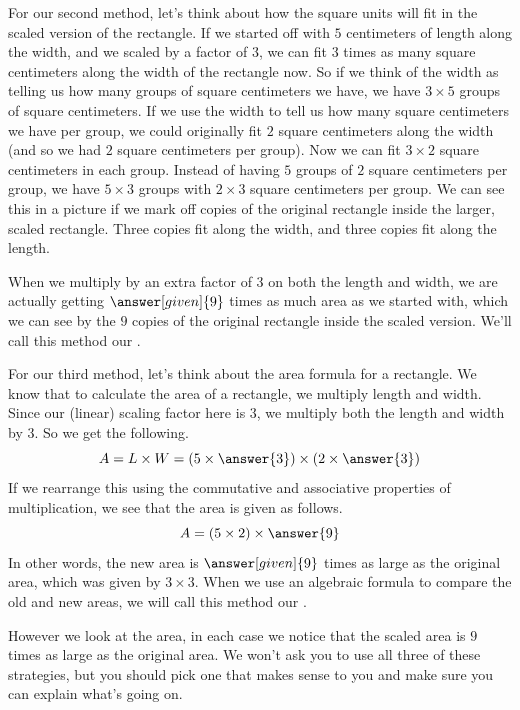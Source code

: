 \documentclass{ximera}
\begin{document}
\begin{explanation}
For our second method, let's think about how the square units will fit in the scaled version of the rectangle. If we started off with $5$ centimeters of length along the width, and we scaled by a factor of $3$, we can fit $3$ times as many square centimeters along the width of the rectangle now. So if we think of the width as telling us how many groups of square centimeters we have, we have $3 \times 5$ groups of square centimeters. If we use the width to tell us how many square centimeters we have per group, we could originally fit $2$ square centimeters along the width (and so we had $2$ square centimeters per group). Now we can fit $3 \times 2$ square centimeters in each group. Instead of having $5$ groups of $2$ square centimeters per group, we have $5 \times 3$ groups with $2 \times 3$ square centimeters per group. We can see this in a picture if we mark off copies of the original rectangle inside the larger, scaled rectangle. Three copies fit along the width, and three copies fit along the length.
\begin{image}
\end{image}
When we multiply by an extra factor of $3$ on both the length and width, we are actually getting $\answer[given]{9}$ times as much area as we started with, which we can see by the $9$ copies of the original rectangle inside the scaled version. We'll call this method our .

For our third method, let's think about the area formula for a rectangle. We know that to calculate the area of a rectangle, we multiply length and width. Since our (linear) scaling factor here is $3$, we multiply both the length and width by $3$. So we get the following.
\[
A = L \times W = (5 \times \answer{3}) \times (2 \times \answer{3})
\]
If we rearrange this using the commutative and associative properties of multiplication, we see that the area is given as follows.
\[
A = (5 \times 2) \times \answer{9}
\]
In other words, the new area is $\answer[given]{9}$ times as large as the original area, which was given by $3 \times 3$. When we use an algebraic formula to compare the old and new areas, we will call this method our .

However we look at the area, in each case we notice that the scaled area is $9$ times as large as the original area. We won't ask you to use all three of these strategies, but you should pick one that makes sense to you and make sure you can explain what's going on.
\end{explanation}
\end{document}
